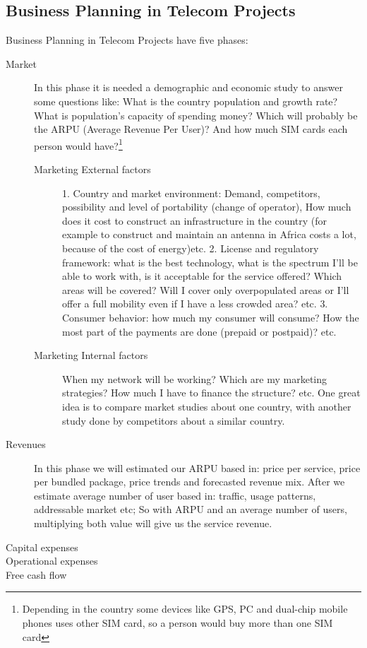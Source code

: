\documentclass[a4paper,11pt]{article}
\begin{document}
\subsection{Business Planning in Telecom Projects}
Business Planning in Telecom Projects have five phases:

\begin{description}
\item[Market] In this phase it is needed a demographic and economic study to 
  answer some questions like: What is the  country population and growth  rate? What is  population's capacity of
  spending money?  Which will probably be  the ARPU (Average  Revenue Per User)?
  And  how much  SIM cards  each  person would  have?\footnote{Depending in  the
    country some devices like GPS, PC and dual-chip mobile phones uses other SIM card, so a
    person would buy more than one SIM card} 
\begin{description}
\item[Marketing External factors] {\color{blue}1.  Country and market environment:} Demand,
  competitors, possibility  and level of  portability (change of  operator), How
  much does it cost  to construct  an infrastructure  in the  country (for  example to
  construct and maintain an antenna in Africa costs a lot, because of the cost of energy)etc. {\color{blue}2.  License and
  regulatory framework:} what is the best technology, what is the spectrum I'll
  be able  to work with, is it  acceptable for the service  offered? Which areas
  will be  covered? Will I cover only  overpopulated areas or I'll  offer a full
  mobility even if  I have a less crowded area? etc.  {\color{blue}3. Consumer behavior:} how
  much my  consumer will  consume? How the  most part  of the payments  are done
  (prepaid or postpaid)? etc.

\item[Marketing Internal factors] When my  network will be working? Which are my
  marketing strategies? How much I have to finance the structure?  etc. One 
  great idea is to compare market studies about one country, with another study
  done by competitors about a similar country.

\end{description}

\item[Revenues] In  this phase we  will estimated our  ARPU based in:  price per
  service,  price  per bundled  package,  price  trends  and forecasted  revenue
  mix.  After  we estimate  average  number of  user  based  in: traffic,  usage
  patterns, addressable market etc; So with {\color{red}ARPU} and an {\color{red}average number of users},
  multiplying both value will give us the {\color{red}service revenue.}

\item[Capital expenses]
\item[Operational expenses]
\item[Free cash flow]

\end{description}
\end{document}
